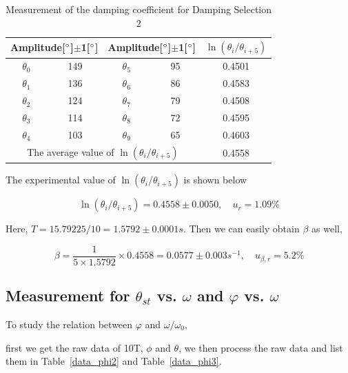 \begin{table}[H] 
\centering

\begin{tabular}{|c|c|c|c|c|}
\hline

\multicolumn{2}{|c}{Amplitude[$^\circ$]$\pm$1[$^\circ$]} & 
\multicolumn{2}{|c|}{Amplitude[$^\circ$]$\pm$1[$^\circ$]} &
$\ln(\theta_i/\theta_{i+5})$\\\hline

$\theta_0$ & 149 & $\theta_5$ & 95 & 0.4501 \\\hline
$\theta_1$ & 136 & $\theta_6$ & 86 & 0.4583 \\\hline
$\theta_2$ & 124 & $\theta_7$ & 79 & 0.4508 \\\hline
$\theta_3$ & 114 & $\theta_8$ & 72 & 0.4595 \\\hline
$\theta_4$ & 103 & $\theta_9$ & 65 & 0.4603 \\\hline
\multicolumn{4}{|c|}{The average value of $\ln(\theta_i/\theta_{i+5})$}
    & 0.4558 \\\hline 
\end{tabular}

\caption{Measurement of the damping coefficient for Damping Selection 2}
\label{data_damping}
\end{table}

The experimental value of $\ln(\theta_i/\theta_{i+5})$ is shown below

\[
\ln(\theta_i/\theta_{i+5})= 0.4558 \pm 0.0050 , \quad u_r=1.09\%
\]

Here, $T= 15.79225 /10= 1.5792 \pm 0.0001s$. Then we can easily obtain $\beta$
as well, 

\[
\beta=\frac{1}{5\times1.5792}\times0.4558=  0.0577 \pm 0.003s^{-1}, \quad
u_{\beta,r}=5.2\% 
\]

\subsection{Measurement for $\theta_{st}$ vs. $\omega$ and $\varphi$ vs.
  $\omega$}  

To study the relation between $\varphi$ and $\omega/\omega_0$, 

first we get the raw data of 10T, $\phi$ and $\theta$,
we then process the raw data and list them in Table~\ref{data_phi2} and
Table~\ref{data_phi3}. 


